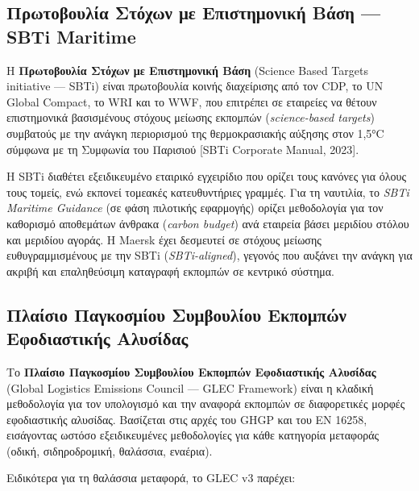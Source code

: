 \documentclass[11pt,a4paper,greek,twoside]{template-xe}
\begin{document}
\subsection{Πρωτοβουλία Στόχων με Επιστημονική Βάση --- SBTi
Maritime}\label{ux3c0ux3c1ux3c9ux3c4ux3bfux3b2ux3bfux3c5ux3bbux3afux3b1-ux3c3ux3c4ux3ccux3c7ux3c9ux3bd-ux3bcux3b5-ux3b5ux3c0ux3b9ux3c3ux3c4ux3b7ux3bcux3bfux3bdux3b9ux3baux3ae-ux3b2ux3acux3c3ux3b7-sbti-maritime}

Η \textbf{Πρωτοβουλία Στόχων με Επιστημονική Βάση} (Science Based
Targets initiative --- SBTi) είναι πρωτοβουλία κοινής διαχείρισης από
τον CDP, το UN Global Compact, το WRI και το WWF, που επιτρέπει σε
εταιρείες να θέτουν επιστημονικά βασισμένους στόχους μείωσης εκπομπών
(\emph{science-based targets}) συμβατούς με την ανάγκη περιορισμού της
θερμοκρασιακής αύξησης στον 1,5°C σύμφωνα με τη Συμφωνία του Παρισιού
{[}SBTi Corporate Manual, 2023{]}.

Η SBTi διαθέτει εξειδικευμένο εταιρικό εγχειρίδιο που ορίζει τους
κανόνες για όλους τους τομείς, ενώ εκπονεί τομεακές κατευθυντήριες
γραμμές. Για τη ναυτιλία, το \emph{SBTi Maritime Guidance} (σε φάση
πιλοτικής εφαρμογής) ορίζει μεθοδολογία για τον καθορισμό αποθεμάτων
άνθρακα (\emph{carbon budget}) ανά εταιρεία βάσει μεριδίου στόλου και
μεριδίου αγοράς. Η Maersk έχει δεσμευτεί σε στόχους μείωσης
ευθυγραμμισμένους με την SBTi (\emph{SBTi-aligned}), γεγονός που αυξάνει
την ανάγκη για ακριβή και επαληθεύσιμη καταγραφή εκπομπών σε κεντρικό
σύστημα.

\subsection{Πλαίσιο Παγκοσμίου Συμβουλίου Εκπομπών Εφοδιαστικής
Αλυσίδας}\label{ux3c0ux3bbux3b1ux3afux3c3ux3b9ux3bf-ux3c0ux3b1ux3b3ux3baux3bfux3c3ux3bcux3afux3bfux3c5-ux3c3ux3c5ux3bcux3b2ux3bfux3c5ux3bbux3afux3bfux3c5-ux3b5ux3baux3c0ux3bfux3bcux3c0ux3ceux3bd-ux3b5ux3c6ux3bfux3b4ux3b9ux3b1ux3c3ux3c4ux3b9ux3baux3aeux3c2-ux3b1ux3bbux3c5ux3c3ux3afux3b4ux3b1ux3c2}

Το \textbf{Πλαίσιο Παγκοσμίου Συμβουλίου Εκπομπών Εφοδιαστικής Αλυσίδας}
(Global Logistics Emissions Council --- GLEC Framework) είναι η κλαδική
μεθοδολογία για τον υπολογισμό και την αναφορά εκπομπών σε διαφορετικές
μορφές εφοδιαστικής αλυσίδας. Βασίζεται στις αρχές του GHGP και του EN
16258, εισάγοντας ωστόσο εξειδικευμένες μεθοδολογίες για κάθε κατηγορία
μεταφοράς (οδική, σιδηροδρομική, θαλάσσια, εναέρια).

Ειδικότερα για τη θαλάσσια μεταφορά, το GLEC v3 παρέχει:
\end{document}
